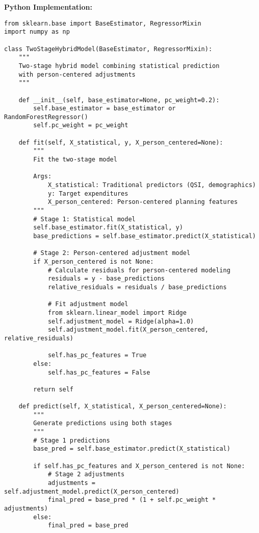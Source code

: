 \documentclass[12pt]{article}
\begin{document}
\textbf{Python Implementation:}
\begin{lstlisting}
from sklearn.base import BaseEstimator, RegressorMixin
import numpy as np

class TwoStageHybridModel(BaseEstimator, RegressorMixin):
    """
    Two-stage hybrid model combining statistical prediction 
    with person-centered adjustments
    """
    
    def __init__(self, base_estimator=None, pc_weight=0.2):
        self.base_estimator = base_estimator or RandomForestRegressor()
        self.pc_weight = pc_weight
        
    def fit(self, X_statistical, y, X_person_centered=None):
        """
        Fit the two-stage model
        
        Args:
            X_statistical: Traditional predictors (QSI, demographics)
            y: Target expenditures
            X_person_centered: Person-centered planning features
        """
        # Stage 1: Statistical model
        self.base_estimator.fit(X_statistical, y)
        base_predictions = self.base_estimator.predict(X_statistical)
        
        # Stage 2: Person-centered adjustment model
        if X_person_centered is not None:
            # Calculate residuals for person-centered modeling
            residuals = y - base_predictions
            relative_residuals = residuals / base_predictions
            
            # Fit adjustment model
            from sklearn.linear_model import Ridge
            self.adjustment_model = Ridge(alpha=1.0)
            self.adjustment_model.fit(X_person_centered, relative_residuals)
            
            self.has_pc_features = True
        else:
            self.has_pc_features = False
            
        return self
    
    def predict(self, X_statistical, X_person_centered=None):
        """
        Generate predictions using both stages
        """
        # Stage 1 predictions
        base_pred = self.base_estimator.predict(X_statistical)
        
        if self.has_pc_features and X_person_centered is not None:
            # Stage 2 adjustments
            adjustments = self.adjustment_model.predict(X_person_centered)
            final_pred = base_pred * (1 + self.pc_weight * adjustments)
        else:
            final_pred = base_pred
            

\end{lstlisting}
\end{document}

